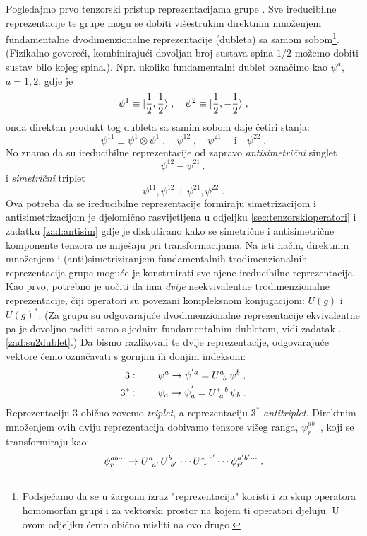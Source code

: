 Pogledajmo prvo tenzorski pristup reprezentacijama grupe .
Sve ireducibilne reprezentacije te grupe mogu se dobiti
višestrukim direktnim množenjem fundamentalne dvodimenzionalne reprezentacije
(dubleta) sa samom sobom\footnote{Podsjećamo da se u žargonu izraz
    "reprezentacija" koristi i za skup operatora homomorfan grupi i za vektorski prostor
    na kojem ti operatori djeluju. U ovom odjeljku ćemo obično
misliti na ovo drugo.}. (Fizikalno govoreći, kombinirajući dovoljan broj
sustava spina $1/2$ možemo dobiti sustav bilo kojeg spina.). Npr. ukoliko
fundamentalni dublet označimo kao
$\psi^a$, $a=1,2$, gdje je 
\begin{displaymath}
 \psi^1 \equiv | \frac{1}{2},\frac{1}{2} \rangle \;, \quad \psi^2
\equiv | \frac{1}{2}, -\frac{1}{2} \rangle \;,
\end{displaymath}
onda direktan produkt tog dubleta sa samim sobom daje četiri stanja:
\begin{displaymath}
 \psi^{11}\equiv \psi^1 \otimes \psi^1 \;, \quad \psi^{12} \;, \quad \psi^{21} \;
 \quad \text{i} \quad \psi^{22} \;.
\end{displaymath}
No znamo da su ireducibilne reprezentacije od  zapravo 
\emph{antisimetrični} singlet
\begin{displaymath}
   \psi^{12} - \psi^{21} \,,
\end{displaymath}
i \emph{simetrični} triplet
\begin{displaymath}
 \psi^{11},  \psi^{12} + \psi^{21}, \psi^{22} \;.
\end{displaymath}
Ova potreba da se ireducibilne reprezentacije formiraju 
simetrizacijom i antisimetrizacijom je djelomično rasvijetljena
u odjeljku \ref{sec:tenzorskioperatori} i zadatku \ref{zad:antisim}
gdje je diskutirano
kako se simetrične i antisimetrične komponente 
tenzora ne miješaju pri transformacijama.
Na isti način, direktnim množenjem i (anti)simetriziranjem
fundamentalnih trodimenzionalnih reprezentacija grupe  moguće
je konstruirati sve njene ireducibilne reprezentacije. Kao prvo, potrebno je uočiti da
 ima \emph{dvije} neekvivalentne trodimenzionalne reprezentacije,
čiji operatori su povezani kompleksnom konjugacijom: $U(g)$ i
$U(g)^*$. (Za  grupu su odgovarajuće dvodimenzionalne reprezentacije ekvivalentne
pa je dovoljno raditi samo s jednim fundamentalnim dubletom, vidi
zadatak \thechapter.\ref{zad:su2dublet}.)
Da bismo razlikovali te dvije reprezentacije, odgovarajuće vektore
ćemo označavati s gornjim ili donjim indeksom:
\begin{align}
 3&: \qquad  \psi^a \to \psi^{'a} = \tensor{U}{^a_b} \, \psi^{b} \;, \\
 3^*&: \qquad  \psi_a \to \psi^{'}_a = \tensor{U}{^*_a^b} \, \psi_{b} \;.
\label{eq:su3fundamental}
\end{align}
Reprezentaciju 3 obično zovemo \emph{triplet}, a
reprezentaciju $3^*$ \emph{antitriplet}.
Direktnim množenjem ovih dviju  reprezentacija dobivamo 
tenzore višeg ranga, $\psi^{ab\cdots}_{r\cdots}$, koji
se transformiraju kao:
\begin{equation}
  \psi^{ab\cdots}_{r\cdots} \to 
 \tensor{U}{^{a}_{a'}} \tensor{U}{^{b}_{b'}} \cdots \tensor{U}{^*_r^{r'}} \cdots
  \psi^{a'b'\cdots}_{r'\cdots} \;.
\label{eq:mntensor}
\end{equation}

